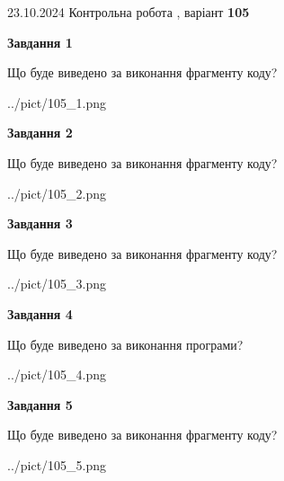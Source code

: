 \documentclass[12pt, ukrainian]{article}
\begin{document}
{\Large{23.10.2024 Контрольна робота , варіант  \No \textbf { 105 }\par}}
{
\begin {large}
{\begin {center}\textbf{Завдання 1}\end {center}}

Що буде виведено за виконання фрагменту коду?\par
\begin{center}
	{../pict/105_1.png}
\end{center}
\newpage

{\begin {center}\textbf{Завдання 2}\end {center}}

Що буде виведено за виконання фрагменту коду?\par
\begin{center}
	{../pict/105_2.png}
\end{center}
\newpage

{\begin {center}\textbf{Завдання 3}\end {center}}

Що буде виведено за виконання фрагменту коду?\par
\begin{center}
	{../pict/105_3.png}
\end{center}
\newpage

{\begin {center}\textbf{Завдання 4}\end {center}}

Що буде виведено за виконання програми?\par
\begin{center}
	{../pict/105_4.png}
\end{center}
\newpage

{\begin {center}\textbf{Завдання 5}\end {center}}

Що буде виведено за виконання фрагменту коду?\par
\begin{center}
	{../pict/105_5.png}
\end{center}
\newpage


\end{large}}
\end{document}
